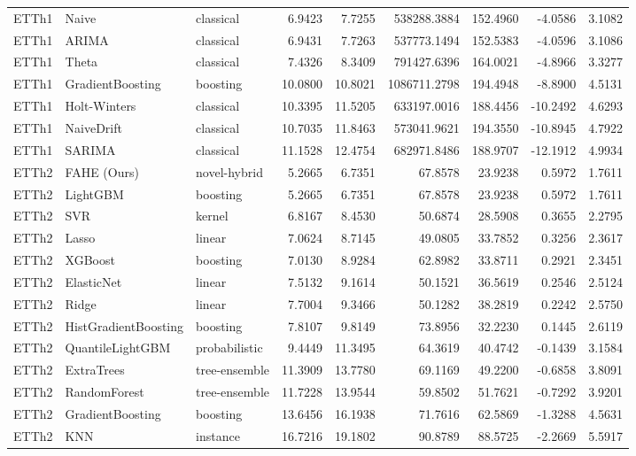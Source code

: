 \begin{tabular}{lllrrrrrr}
ETTh1 & Naive & classical & 6.9423 & 7.7255 & 538288.3884 & 152.4960 & -4.0586 & 3.1082 \\
ETTh1 & ARIMA & classical & 6.9431 & 7.7263 & 537773.1494 & 152.5383 & -4.0596 & 3.1086 \\
ETTh1 & Theta & classical & 7.4326 & 8.3409 & 791427.6396 & 164.0021 & -4.8966 & 3.3277 \\
ETTh1 & GradientBoosting & boosting & 10.0800 & 10.8021 & 1086711.2798 & 194.4948 & -8.8900 & 4.5131 \\
ETTh1 & Holt-Winters & classical & 10.3395 & 11.5205 & 633197.0016 & 188.4456 & -10.2492 & 4.6293 \\
ETTh1 & NaiveDrift & classical & 10.7035 & 11.8463 & 573041.9621 & 194.3550 & -10.8945 & 4.7922 \\
ETTh1 & SARIMA & classical & 11.1528 & 12.4754 & 682971.8486 & 188.9707 & -12.1912 & 4.9934 \\
ETTh2 & FAHE (Ours) & novel-hybrid & 5.2665 & 6.7351 & 67.8578 & 23.9238 & 0.5972 & 1.7611 \\
ETTh2 & LightGBM & boosting & 5.2665 & 6.7351 & 67.8578 & 23.9238 & 0.5972 & 1.7611 \\
ETTh2 & SVR & kernel & 6.8167 & 8.4530 & 50.6874 & 28.5908 & 0.3655 & 2.2795 \\
ETTh2 & Lasso & linear & 7.0624 & 8.7145 & 49.0805 & 33.7852 & 0.3256 & 2.3617 \\
ETTh2 & XGBoost & boosting & 7.0130 & 8.9284 & 62.8982 & 33.8711 & 0.2921 & 2.3451 \\
ETTh2 & ElasticNet & linear & 7.5132 & 9.1614 & 50.1521 & 36.5619 & 0.2546 & 2.5124 \\
ETTh2 & Ridge & linear & 7.7004 & 9.3466 & 50.1282 & 38.2819 & 0.2242 & 2.5750 \\
ETTh2 & HistGradientBoosting & boosting & 7.8107 & 9.8149 & 73.8956 & 32.2230 & 0.1445 & 2.6119 \\
ETTh2 & QuantileLightGBM & probabilistic & 9.4449 & 11.3495 & 64.3619 & 40.4742 & -0.1439 & 3.1584 \\
ETTh2 & ExtraTrees & tree-ensemble & 11.3909 & 13.7780 & 69.1169 & 49.2200 & -0.6858 & 3.8091 \\
ETTh2 & RandomForest & tree-ensemble & 11.7228 & 13.9544 & 59.8502 & 51.7621 & -0.7292 & 3.9201 \\
ETTh2 & GradientBoosting & boosting & 13.6456 & 16.1938 & 71.7616 & 62.5869 & -1.3288 & 4.5631 \\
ETTh2 & KNN & instance & 16.7216 & 19.1802 & 90.8789 & 88.5725 & -2.2669 & 5.5917 \\

\end{tabular}
